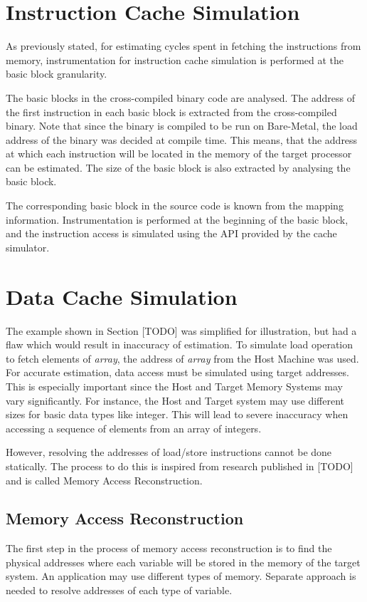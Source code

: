 \section{Instruction Cache Simulation}
As previously stated, for estimating cycles spent in fetching the instructions from memory, instrumentation for instruction cache simulation is performed at the basic block granularity. 

The basic blocks in the cross-compiled binary code are analysed. The address of the first instruction in each basic block is extracted from the cross-compiled binary. Note that since the binary is compiled to be run on Bare-Metal, the load address of the binary was decided at compile time. This means, that the address at which each instruction will be located in the memory of the target processor can be estimated. The size of the basic block is also extracted by analysing the basic block.

The corresponding basic block in the source code is known from the mapping information. Instrumentation is performed at the beginning of the basic block, and the instruction access is simulated using the API provided by the cache simulator. 

\section{Data Cache Simulation}
The example shown in Section [TODO] was simplified for illustration, but had a flaw which would result in inaccuracy of estimation. To simulate load operation to fetch elements of \emph{array}, the address of \emph{array} from the Host Machine was used. For accurate estimation, data access must be simulated using target addresses. This is especially important since the Host and Target Memory Systems may vary significantly. For instance, the Host and Target system may use different sizes for basic data types like integer. This will lead to severe inaccuracy when accessing a sequence of elements from an array of integers. 

However, resolving the addresses of load/store instructions cannot be done statically. The process to do this is inspired from research published in [TODO] and is called Memory Access Reconstruction. 

\subsection{Memory Access Reconstruction}
The first step in the process of memory access reconstruction is to find the physical addresses where each variable will be stored in the memory of the target system. An application may use different types of memory. Separate approach is needed to resolve addresses of each type of variable.

